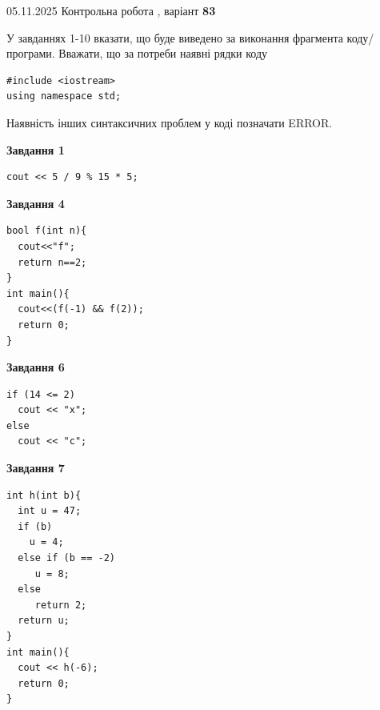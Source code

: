 \documentclass[12pt, ukrainian]{article}
\begin{document}
\newpage

{\Large{05.11.2025 Контрольна робота , варіант  \No \textbf { 83 }\par}}
{
\begin {large}
У завданнях 1-10 вказати, що буде виведено за виконання фрагмента коду/про\-гра\-ми.
Вважати, що за потреби наявні рядки коду
\begin{verbatim}
#include <iostream>
using namespace std;
\end{verbatim}
Наявність інших синтаксичних проблем у коді позначати ERROR.

\begin{minipage}[t]{7.0cm}

\begin{center}
\textbf{Завдання 1}
\end{center}
\vspace{-8mm}

\begin{verbatim}
cout << 5 / 9 % 15 * 5;
\end{verbatim}



\begin{center}
\textbf{Завдання 4}
\end{center}
\vspace{-8mm}

\begin{verbatim}
bool f(int n){
  cout<<"f";
  return n==2;
}
int main(){
  cout<<(f(-1) && f(2));
  return 0;
}
\end{verbatim}



\begin{center}
\textbf{Завдання 6}
\end{center}
\vspace{-8mm}

\begin{verbatim}
if (14 <= 2)
  cout << "x";
else
  cout << "c";
\end{verbatim}



\begin{center}
\textbf{Завдання 7}
\end{center}
\vspace{-8mm}

\begin{verbatim}
int h(int b){
  int u = 47;
  if (b)
    u = 4;
  else if (b == -2)
     u = 8;
  else
     return 2;
  return u;
}
int main(){
  cout << h(-6);
  return 0;
}
\end{verbatim}


\end{minipage}
\end{large}}
\end{document}

